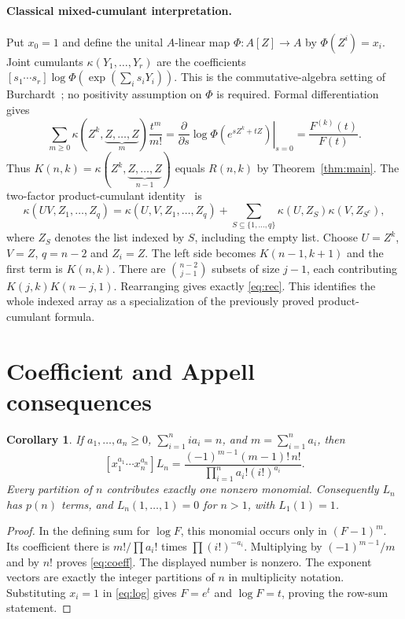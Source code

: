 \documentclass[11pt]{article}
\newtheorem{corollary}[theorem]{Corollary}
\begin{document}
\paragraph{Classical mixed-cumulant interpretation.}
Put $x_0=1$ and define the unital $A$-linear map
$\Phi:A[Z]\longrightarrow A$ by $\Phi(Z^i)=x_i$.
Joint cumulants $\kappa(Y_1,\ldots,Y_r)$ are the coefficients
$[s_1\cdots s_r]\log\Phi(\exp(\sum_i s_iY_i))$.
This is the commutative-algebra setting of
Burchardt~\cite[Section 1.2, (3)]{burchardt}; no positivity assumption
on $\Phi$ is required. Formal differentiation gives
\[
 \sum_{m\geq0}\kappa(Z^k,\underbrace{Z,\ldots,Z}_{m})\frac{t^m}{m!}
 =\left.\frac{\partial}{\partial s}\log\Phi(e^{sZ^k+tZ})\right|_{s=0}
 =\frac{F^{(k)}(t)}{F(t)}.
\]
Thus $K(n,k)=\kappa(Z^k,\underbrace{Z,\ldots,Z}_{n-1})$
equals $R(n,k)$ by Theorem~\ref{thm:main}.
The two-factor product-cumulant identity~\cite[(A10)]{btv} is
\[
 \kappa(UV,Z_1,\ldots,Z_q)
 =\kappa(U,V,Z_1,\ldots,Z_q)
 +\sum_{S\subseteq\{1,\ldots,q\}}
   \kappa(U,Z_S)\kappa(V,Z_{S^c}),
\]
where $Z_S$ denotes the list indexed by $S$, including the empty list.
Choose $U=Z^k$, $V=Z$, $q=n-2$ and $Z_i=Z$.
The left side becomes $K(n-1,k+1)$ and the first term is $K(n,k)$.
There are $\binom{n-2}{j-1}$ subsets of size $j-1$, each contributing
$K(j,k)K(n-j,1)$. Rearranging gives exactly \eqref{eq:rec}.
This identifies the whole indexed array as a specialization of the
previously proved product-cumulant formula.

\section{Coefficient and Appell consequences}
\begin{corollary}\label{cor:coeff}
If $a_1,\ldots,a_n\geq0$, $\sum_{i=1}^n ia_i=n$, and
$m=\sum_{i=1}^na_i$, then
\begin{equation}\label{eq:coeff}
 [x_1^{a_1}\cdots x_n^{a_n}]L_n
 =\frac{(-1)^{m-1}(m-1)!\,n!}{\prod_{i=1}^n a_i!(i!)^{a_i}}.
\end{equation}
Every partition of $n$ contributes exactly one nonzero monomial.
Consequently $L_n$ has $p(n)$ terms, and $L_n(1,\ldots,1)=0$
for $n>1$, with $L_1(1)=1$.
\end{corollary}
\begin{proof}
In the defining sum for $\log F$, this monomial occurs only in
$(F-1)^m$. Its coefficient there is $m!/\prod a_i!$ times
$\prod(i!)^{-a_i}$. Multiplying by $(-1)^{m-1}/m$ and by $n!$
proves \eqref{eq:coeff}. The displayed number is nonzero. The exponent
vectors are exactly the integer partitions of $n$ in multiplicity
notation. Substituting $x_i=1$ in \eqref{eq:log} gives $F=e^t$ and
$\log F=t$, proving the row-sum statement.
\end{proof}
\end{document}
